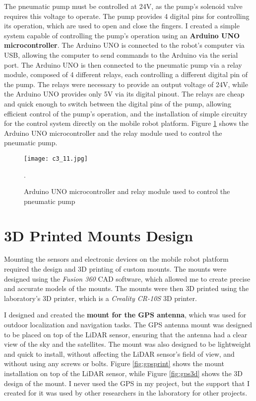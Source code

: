 The pneumatic pump must be controlled at 24V, as the pump's solenoid valve requires this voltage to operate.
The pump provides 4 digital pins for controlling its operation, which are used to open and close the fingers.
I created a simple system capable of controlling the pump's operation using an \textbf{Arduino UNO microcontroller}.
The Arduino UNO is connected to the robot's computer via USB, allowing the computer to send commands to the Arduino
via the serial port. The Arduino UNO is then connected to the pneumatic pump via a relay module,
composed of 4 different relays, each controlling a different digital pin of the pump. The relays were necessary
to provide an output voltage of 24V, while the Arduino UNO provides only 5V via its digital pinout.
The relays are cheap and quick enough to switch between the digital pins of the pump, allowing efficient
control of the pump's operation, and the installation of simple circuitry for the control system 
directly on the mobile robot platform. Figure \ref{fig:c3_img10} shows the Arduino UNO microcontroller
and the relay module used to control the pneumatic pump.

\begin{figure}[t]
    \centering
    \texttt{[image: c3\_11.jpg]}
    \captionsetup{width=1\linewidth}
    \caption{Arduino UNO microcontroller and relay module used to control the pneumatic pump}.
    \label{fig:c3_img10}
\end{figure}

\section{3D Printed Mounts Design}

Mounting the sensors and electronic devices on the mobile robot platform required the design and 3D printing
of custom mounts. The mounts were designed using the \textit{Fusion 360} CAD software, which allowed me to create
precise and accurate models of the mounts. The mounts were then 3D printed using the laboratory's 3D printer,
which is a \textit{Creality CR-10S} 3D printer. 

I designed and created the \textbf{mount for the GPS antenna}, which was used for outdoor localization
and navigation tasks. The GPS antenna mount was designed to be placed on top of the LiDAR sensor, ensuring
that the antenna had a clear view of the sky and the satellites. The mount was also designed to be lightweight
and quick to install, without affecting the LiDAR sensor's field of view, and without using any screws or bolts.
Figure \ref{fig:gpsprint} shows the mount installation on top of the LiDAR sensor, while Figure \ref{fig:gps3d}
shows the 3D design of the mount.
I never used the GPS in my project, but the support that I created for it was used by other researchers 
in the laboratory for other projects.

